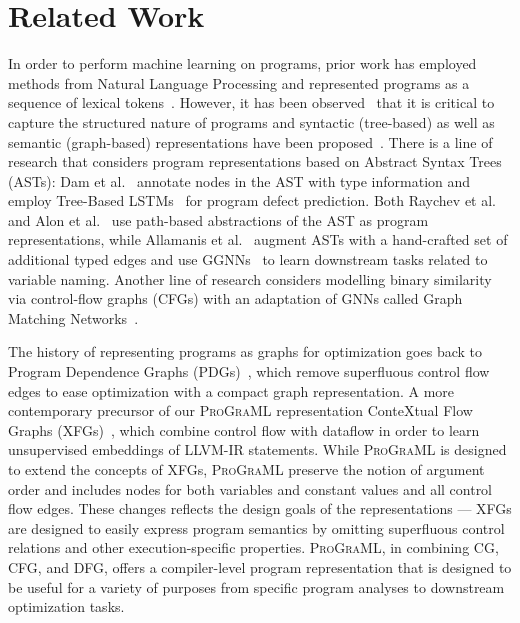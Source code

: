 \section{Related Work}

In order to perform machine learning on programs, prior work has
employed methods from Natural Language Processing and represented
programs as a sequence of lexical tokens~\cite{Allamanis2013a,
  Allamanis2016d, Cummins2017b}. However, it has been
observed~\cite{Raychev2015,Allamanis2017b,Alon2018c} that it is
critical to capture the structured nature of programs and syntactic
(tree-based) as well as semantic (graph-based) representations have
been proposed~\cite{Allamanis2017a,Brauckmann2020}.  There is a line
of research that considers program representations based on Abstract
Syntax Trees (ASTs): Dam et al.~\cite{Dam2018} annotate nodes in the
AST with type information and employ Tree-Based LSTMs~\cite{Tai2015a}
for program defect prediction.  Both Raychev et al.~\cite{Raychev2015}
and Alon et al.~\cite{Alon2018a,Alon2018c} use path-based abstractions
of the AST as program representations, while Allamanis et
al.~\cite{Allamanis2017b} augment ASTs with a hand-crafted set of
additional typed edges and use GGNNs~\cite{Li2015a} to learn
downstream tasks related to variable naming. Another line of research
considers modelling binary similarity via control-flow graphs (CFGs)
with an adaptation of GNNs called Graph Matching
Networks~\cite{Li2019}.

The history of representing programs as graphs for optimization goes
back to Program Dependence Graphs (PDGs)~\cite{Ferrante1987}, which
remove superfluous control flow edges to ease optimization with a
compact graph representation. A more contemporary precursor of our
\textsc{ProGraML} representation ConteXtual Flow Graphs
(XFGs)~\cite{Ben-nun2018}, which combine control flow with dataflow in
order to learn unsupervised embeddings of LLVM-IR statements. While
\textsc{ProGraML} is designed to extend the concepts of XFGs,
\textsc{ProGraML} preserve the notion of argument order and includes
nodes for both variables and constant values and all control flow
edges. These changes reflects the design goals of the representations
--- XFGs are designed to easily express program semantics by omitting
superfluous control relations and other execution-specific
properties. \textsc{ProGraML}, in combining CG, CFG, and DFG, offers a
compiler-level program representation that is designed to be useful
for a variety of purposes from specific program analyses to downstream
optimization tasks.

